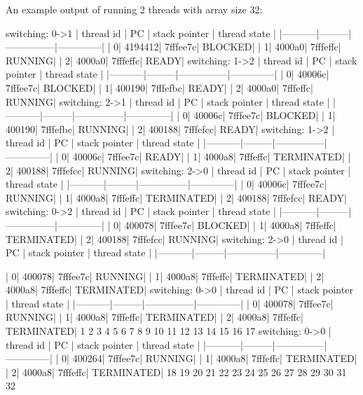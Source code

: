 \documentclass[a4paper]{article}
\begin{document}
An example output of running 2 threads with array size 32:

\begin{textcode}
switching: 0->1
| thread id |      PC | stack pointer | thread state |
|-----------|---------|---------------|--------------|
|          0|  4194412|       7fffee7c|       BLOCKED|
|          1|   4000a0|       7fffeffc|       RUNNING|
|          2|   4000a0|       7fffeffc|         READY|
switching: 1->2
| thread id |      PC | stack pointer | thread state |
|-----------|---------|---------------|--------------|
|          0|   40006c|       7fffee7c|       BLOCKED|
|          1|   400190|       7fffefbc|         READY|
|          2|   4000a0|       7fffeffc|       RUNNING|
switching: 2->1
| thread id |      PC | stack pointer | thread state |
|-----------|---------|---------------|--------------|
|          0|   40006c|       7fffee7c|       BLOCKED|
|          1|   400190|       7fffefbc|       RUNNING|
|          2|   400188|       7fffefcc|         READY|
switching: 1->2
| thread id |      PC | stack pointer | thread state |
|-----------|---------|---------------|--------------|
|          0|   40006c|       7fffee7c|         READY|
|          1|   4000a8|       7fffeffc|    TERMINATED|
|          2|   400188|       7fffefcc|       RUNNING|
switching: 2->0
| thread id |      PC | stack pointer | thread state |
|-----------|---------|---------------|--------------|
|          0|   40006c|       7fffee7c|       RUNNING|
|          1|   4000a8|       7fffeffc|    TERMINATED|
|          2|   400188|       7fffefcc|         READY|
switching: 0->2
| thread id |      PC | stack pointer | thread state |
|-----------|---------|---------------|--------------|
|          0|   400078|       7fffee7c|       BLOCKED|
|          1|   4000a8|       7fffeffc|    TERMINATED|
|          2|   400188|       7fffefcc|       RUNNING|
switching: 2->0
| thread id |      PC | stack pointer | thread state |
|-----------|---------|---------------|--------------|

|          0|   400078|       7fffee7c|       RUNNING|
|          1|   4000a8|       7fffeffc|    TERMINATED|
|          2|   4000a8|       7fffeffc|    TERMINATED|
switching: 0->0
| thread id |      PC | stack pointer | thread state |
|-----------|---------|---------------|--------------|
|          0|   400078|       7fffee7c|       RUNNING|
|          1|   4000a8|       7fffeffc|    TERMINATED|
|          2|   4000a8|       7fffeffc|    TERMINATED|
1 2 3 4 5 6 7 8 9 10 11 12 13 14 15 16 17 
switching: 0->0
| thread id |      PC | stack pointer | thread state |
|-----------|---------|---------------|--------------|
|          0|   400264|       7fffee7c|       RUNNING|
|          1|   4000a8|       7fffeffc|    TERMINATED|
|          2|   4000a8|       7fffeffc|    TERMINATED|
18 19 20 21 22 23 24 25 26 27 28 29 30 31 32
\end{textcode}
\end{document}

